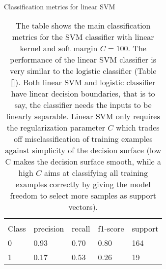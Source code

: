 \documentclass[11pt]{article}
\theoremstyle{definition}
\theoremstyle{remark}
\begin{document}

\begin{table}[H]
\caption{Classification metrics for linear SVM}
\begin{center} 
\begin{tabular}{lllll}
\hline
\multicolumn{1}{c}{} \\
Class & precision & recall & f1-score & support     \\
\hline
0 & 0.93  &    0.70   &   0.80   &    164 \\
1 & 0.17  &    0.53   &   0.26   &    19 \\
\hline
\end{tabular}
\caption{The table shows the main classification metrics for the SVM classifier with linear kernel and soft margin $C=100$. The performance of the linear SVM classifier is very similar to the logistic classifier (Table \ref{}). 
Both linear SVM and logistic classifier have linear decision boundaries, that is to say, the classifier needs the inputs to be linearly separable. Linear SVM only requires the regularization parameter $C$ which trades off misclassification of training examples against simplicity of the decision surface (low C makes the decision surface smooth, while a high $C$ aims at classifying all training examples correctly by giving the model freedom to select more samples as support vectors).}  \label{tab:svm} 
\end{center}
\end{table}
\end{document}
